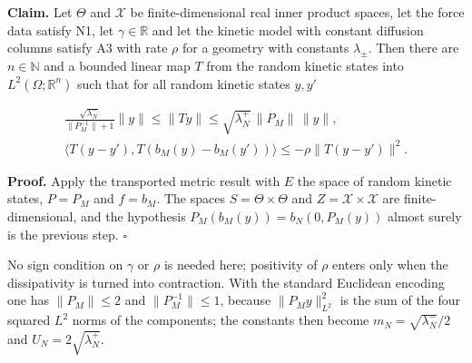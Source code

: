 \documentclass[11pt,a4paper]{report}
\begin{document}
\textbf{Claim.} Let \(\Theta\) and \(\mathcal X\) be finite-dimensional real inner product spaces, let the force data satisfy N1, let \(\gamma\in\mathbb R\) and let the kinetic model with constant diffusion columns satisfy A3 with rate \(\rho\) for a geometry with constants \(\lambda_\pm\). Then there are \(n\in\mathbb N\) and a bounded linear map \(T\) from the random kinetic states into \(L^2(\Omega;\mathbb R^n)\) such that for all random kinetic states \(y,y'\)


\[\begin{gathered}\frac{\sqrt{\lambda_N^-}}{\|P_M^{-1}\|+1}\|y\|\le\|Ty\|\le\sqrt{\lambda_N^+}\,\|P_M\|\,\|y\|,\\ \bigl\langle T(y-y'),T(b_M(y)-b_M(y'))\bigr\rangle\le-\rho\|T(y-y')\|^2 .\end{gathered}\]


\textbf{Proof.} Apply the transported metric result with \(E\) the space of random kinetic states, \(P=P_M\) and \(f=b_M\). The spaces \(S=\Theta\times\Theta\) and \(Z=\mathcal X\times\mathcal X\) are finite-dimensional, and the hypothesis \(P_M(b_M(y))=b_N(0,P_M(y))\) almost surely is the previous step. \(\square\)




No sign condition on \(\gamma\) or \(\rho\) is needed here; positivity of \(\rho\) enters only when the dissipativity is turned into contraction. With the standard Euclidean encoding one has \(\|P_M\|\le2\) and \(\|P_M^{-1}\|\le1\), because \(\|P_My\|_{L^2}^2\) is the sum of the four squared \(L^2\) norms of the components; the constants then become \(m_N=\sqrt{\lambda_N^-}/2\) and \(U_N=2\sqrt{\lambda_N^+}\).
\end{document}

